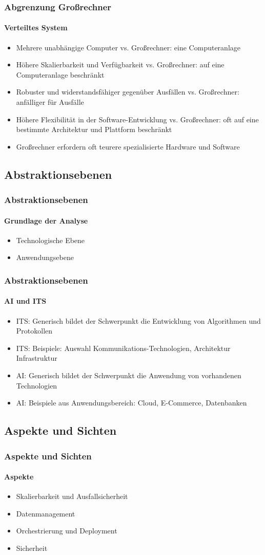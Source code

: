 \begin{frame}
  \frametitle{Abgrenzung Großrechner}
  \framesubtitle{Verteiltes System}
  \begin{itemize}
  \item Mehrere unabhängige Computer vs. Großrechner: eine Computeranlage
  \item Höhere Skalierbarkeit und Verfügbarkeit vs. Großrechner: auf eine Computeranlage beschränkt
  \item Robuster und widerstandsfähiger gegenüber Ausfällen vs. Großrechner: anfälliger für Ausfälle
  \item Höhere Flexibilität in der Software-Entwicklung vs. Großrechner: oft auf eine bestimmte Architektur und Plattform beschränkt
  \item Großrechner erfordern oft teurere spezialisierte Hardware und Software
  \end{itemize}

\end{frame}


\subsection{Abstraktionsebenen}
\begin{frame}
  \frametitle{Abstraktionsebenen}
  \framesubtitle{Grundlage der Analyse}
  \begin{itemize}
    \item Technologische Ebene 
    \item Anwendungsebene
  \end{itemize}
\end{frame}

\begin{frame}
  \frametitle{Abstraktionsebenen}
  \framesubtitle{AI und ITS}
  \begin{itemize}
    \item ITS: Generisch bildet der Schwerpunkt die Entwicklung von Algorithmen und Protokollen
    \item ITS: Beispiele: Auswahl Kommunikations-Technologien, Architektur Infrastruktur 
    \item AI: Generisch bildet der Schwerpunkt die Anwendung von vorhandenen Technologien 
    \item AI:  Beispiele aus Anwendungsbereich: Cloud, E-Commerce, Datenbanken
  \end{itemize}
\end{frame}

\subsection{Aspekte und Sichten}
\begin{frame}
  \frametitle{Aspekte und Sichten}
  \framesubtitle{Aspekte}
  \begin{itemize}
    \item Skalierbarkeit und Ausfallsicherheit
    \item Datenmanagement
    \item Orchestrierung und Deployment
    \item Sicherheit
  \end{itemize}
\end{frame}

